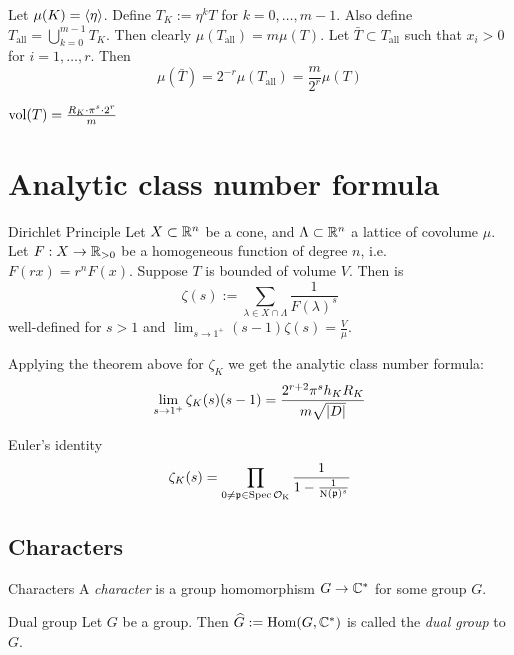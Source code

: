 \documentclass[12pt, a4paper]{article}
\DeclareMathOperator{\Rgz}{\R_{> 0}}
\DeclareMathOperator{\Norm}{N}
\begin{document}
	\newcommand{\Tall}{T_{\text{all}}}

	Let $\mu(K) = \langle \eta \rangle$. Define $T_K := \eta^k T$ for $k = 0, \dots, m-1$.
	Also define $T_{\text{all}} = \bigcup_{k=0}^{m-1} T_K$. Then clearly 
	$\mu(\Tall) = m \mu(T)$. Let $\bar{T} \subset \Tall$ such that 
	$x_i > 0$ for $i = 1, \dots, r$. Then 
	$$\mu(\bar{T}) = 2^{-r} \mu(\Tall) = \frac{m}{2^r}\mu(T)$$

	\begin{prop}{}{}
		$\operatorname{vol}(T) = \frac{R_K \cdot \pi^s \cdot 2^r}{m}$
	\end{prop}
	

	\section{Analytic class number formula}

	\begin{thm}{Dirichlet Principle}{}
		Let $X \subset \mathbb{R}^n$ be a cone, and $\Lambda \subset \mathbb{R}^n$ a lattice of 
		covolume $\mu$. Let $F: X \to \Rgz$ be a homogeneous function of degree $n$, i.e. 
		$F(rx) = r^n F(x)$. Suppose $T$ is bounded of volume $V$. Then is 
		$$ \zeta(s) := \sum_{\lambda \in X \cap \Lambda} \frac{1}{F(\lambda)^s}$$
		well-defined for $s > 1$ and $\lim_{s \to 1^+} (s-1)\zeta(s) = \frac{V}{\mu}$.
	\end{thm}

	Applying the theorem above for $\zeta_K$ we get the analytic class number formula:
	$$\lim_{s \to 1^+} \zeta_K(s)(s-1) = \frac{2^{r+2}\pi^s h_K R_K}{m \sqrt{\lvert D \rvert}}$$

	\begin{thm}{Euler's identity}{}
		$$\zeta_K(s) = \prod_{0 \neq \pp \in \Spec\OK} \frac{1}{1-\frac{1}{\Norm(\pp)^s}}$$	
	\end{thm}
	
	\subsection{Characters}

	\begin{Def}{Characters}{}
		A \emph{character} is a group homomorphism $G \to \mathbb{C}^*$ for some group $G$.
	\end{Def}

	\begin{Def}{Dual group}{}
		Let $G$ be a group. Then $\widehat G := \operatorname{Hom}(G, \mathbb{C}^*)$ is called the \emph{dual group} 
		to $G$.	
	\end{Def}
\end{document}
